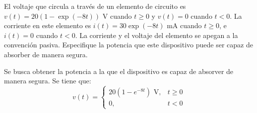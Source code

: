 \documentclass[
  11pt,
  letterpaper,
   addpoints,
   answers
  ]{exam}
\begin{document}
\begin{questions}
    \question     
    El voltaje que circula a través de un elemento de circuito es $v(t) = 20(1 - \exp(-8t))$ V cuando $t \geq 0$ y $v(t) = 0$ cuando $t < 0$. La corriente en este elemento es $i(t) = 30\exp(-8t)$ mA cuando $t \geq 0$, e $i(t) = 0$ cuando $t < 0$. La corriente y el voltaje del elemento se apegan a la convención pasiva. Especifique la potencia que este dispositivo puede ser capaz de absorber de manera segura.
    \begin{solution}
        Se busca obtener la potencia a la que el dispositivo es capaz de absorver de manera segura. Se tiene que:
        \begin{equation}
            v(t) =
            \begin{cases} 
            20(1 - e^{-8t}) \text{ V}, & t \geq 0 \\ 
            0, & t < 0 
            \end{cases}
            \end{equation}
            

\end{solution}
\end{questions}
\end{document}
